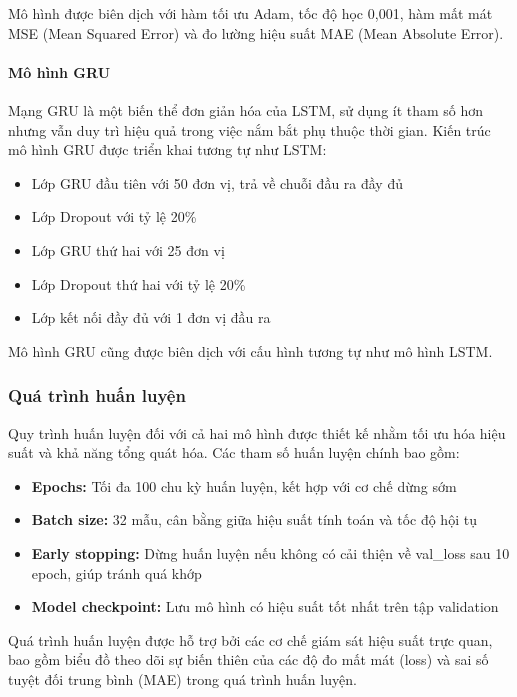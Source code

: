 Mô hình được biên dịch với hàm tối ưu Adam, tốc độ học 0,001, hàm mất mát MSE (Mean Squared Error) và đo lường hiệu suất MAE (Mean Absolute Error).

\paragraph{Mô hình GRU}
Mạng GRU là một biến thể đơn giản hóa của LSTM, sử dụng ít tham số hơn nhưng vẫn duy trì hiệu quả trong việc nắm bắt phụ thuộc thời gian. Kiến trúc mô hình GRU được triển khai tương tự như LSTM:

\begin{itemize}
    \item Lớp GRU đầu tiên với 50 đơn vị, trả về chuỗi đầu ra đầy đủ
    \item Lớp Dropout với tỷ lệ 20\%
    \item Lớp GRU thứ hai với 25 đơn vị
    \item Lớp Dropout thứ hai với tỷ lệ 20\%
    \item Lớp kết nối đầy đủ với 1 đơn vị đầu ra
\end{itemize}

Mô hình GRU cũng được biên dịch với cấu hình tương tự như mô hình LSTM.

\subsubsection{Quá trình huấn luyện}

Quy trình huấn luyện đối với cả hai mô hình được thiết kế nhằm tối ưu hóa hiệu suất và khả năng tổng quát hóa. Các tham số huấn luyện chính bao gồm:

\begin{itemize}
    \item \textbf{Epochs:} Tối đa 100 chu kỳ huấn luyện, kết hợp với cơ chế dừng sớm
    \item \textbf{Batch size:} 32 mẫu, cân bằng giữa hiệu suất tính toán và tốc độ hội tụ
    \item \textbf{Early stopping:} Dừng huấn luyện nếu không có cải thiện về val\_loss sau 10 epoch, giúp tránh quá khớp
    \item \textbf{Model checkpoint:} Lưu mô hình có hiệu suất tốt nhất trên tập validation
\end{itemize}

Quá trình huấn luyện được hỗ trợ bởi các cơ chế giám sát hiệu suất trực quan, bao gồm biểu đồ theo dõi sự biến thiên của các độ đo mất mát (loss) và sai số tuyệt đối trung bình (MAE) trong quá trình huấn luyện.

